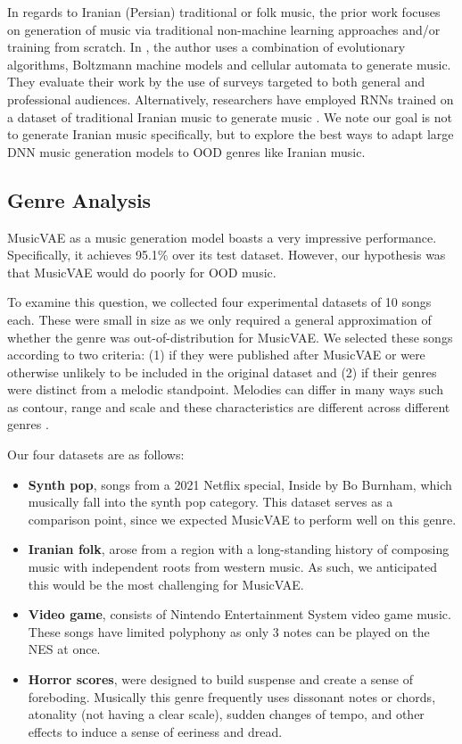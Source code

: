 \documentclass[letterpaper]{article}
\begin{document}
In regards to Iranian (Persian) traditional or folk music, the prior work focuses on generation of music via traditional non-machine learning approaches and/or training from scratch. In \cite{SaharPhD}, the author uses a combination of evolutionary algorithms, Boltzmann machine models and cellular automata to generate music. They evaluate their work by the use of surveys targeted to both general and professional audiences. Alternatively, researchers have employed RNNs trained on a dataset of traditional Iranian music to generate music \cite{rnn-persian}. We note our goal is not to generate Iranian music specifically, but to explore the best ways to adapt large DNN music generation models to OOD genres like Iranian music. 

\subsection{Genre Analysis}
MusicVAE as a music generation model boasts a very impressive performance. Specifically, it achieves 95.1\% over its test dataset. However, our hypothesis was that MusicVAE would do poorly for OOD music. 

To examine this question, we collected four experimental datasets of 10 songs each. These were small in size as we only required a general approximation of whether the genre was out-of-distribution for MusicVAE.
We selected these songs according to two criteria: (1) if they were published after MusicVAE or were otherwise unlikely to be included in the original dataset \cite{musicvae2018} and (2) if their genres were distinct from a melodic standpoint. Melodies can differ in many ways such as contour, range and scale and these characteristics are different across different genres \cite{melodytheory}.

Our four datasets are as follows:
\begin{itemize}
    \item \textbf{Synth pop}, songs from a 2021 Netflix special, Inside by Bo Burnham, which musically fall into the synth pop category. This dataset serves as a comparison point, since we expected MusicVAE to perform well on this genre.
    \item \textbf{Iranian folk}, arose from a region with a long-standing history of composing music with independent roots from western music. As such, we anticipated this would be the most challenging for MusicVAE. 
    \item \textbf{Video game}, consists of Nintendo Entertainment System video game music. These songs have limited polyphony as only 3 notes can be played on the NES at once. 
    \item \textbf{Horror scores}, were designed to build suspense and create a sense of foreboding. Musically this genre frequently uses dissonant notes or chords, atonality (not having a clear scale), sudden changes of tempo, and other effects to induce a sense of eeriness and dread. 
\end{itemize}
\end{document}
